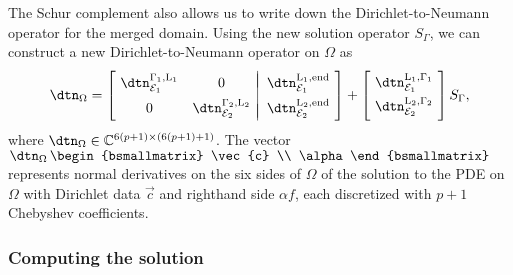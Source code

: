 The Schur complement also allows us to write down the Dirichlet-to-Neumann operator for the merged domain. Using the new solution operator $S_\Gamma$, we can construct a new Dirichlet-to-Neumann operator on $\Omega$ as
\begin{equation}\label{eq:\chap:dtn_2}
\dtn_\Omega = \left[\!\begin{array}{cc|c}
        && \\[-1em]
		\dtn^{\Gamma_1,\mathrm{L}_1}_{\mathcal{E}_1} & 0 & \,\dtn^{\mathrm{L}_1,\text{end}}_{\mathcal{E}_1} \\[0.5em]
    	0 & \dtn^{\Gamma_2,\mathrm{L}_2}_{\mathcal{E}_2} & \,\dtn^{\mathrm{L}_2,\text{end}}_{\mathcal{E}_2} \\[-1em] &&
	\end{array}\!\right] + \left[\!\begin{array}{c} \\[-1em] \dtn^{\mathrm{L}_1,\Gamma_1}_{\mathcal{E}_1} \\[0.4em] \dtn^{\mathrm{L}_2,\Gamma_2}_{\mathcal{E}_2} \\[0.4em] \end{array}\!\right] S_\Gamma,
\end{equation}
where $\dtn_\Omega \in \mathbb{C}^{6(p+1) \times (6(p+1)+1)}$. The vector $\dtn_\Omega \,\begin{bsmallmatrix} \vec{c} \\ \alpha \end{bsmallmatrix}$ represents normal derivatives on the six sides of $\Omega$ of the solution to the PDE on $\Omega$ with Dirichlet data $\vec{c}$ and righthand side $\alpha f$, each discretized with $p+1$ Chebyshev coefficients.

\subsubsection{Computing the solution}

